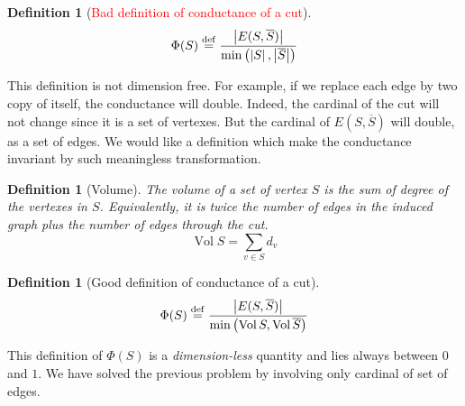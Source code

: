 \documentclass[12pt]{article}
\newtheorem{definition}[lemma]{Definition}
\newcommand{\defeq}{\stackrel{{\rm def}}{=}}
\newcommand{\card}[1]{\left\lvert#1\right\rvert}
\DeclareMathOperator{\vol}{Vol}
\begin{document}
\begin{definition}[\textcolor{red}{Bad definition of conductance of a cut}]
    \textcolor{red}{\[
        \Phi(S) \defeq \frac{\card{E(S,\overline{S})}}{\min\left(\card{S},\card{\overline{S}}\right)}
    \]}
\end{definition}

This definition is not dimension free. For example, if we replace each edge by two copy of itself, the conductance will double. Indeed, the cardinal of the cut will not change since it is a set of vertexes. But the cardinal of $E(S,\overline{S})$ will double, as a set of edges. We would like a definition which make the conductance invariant by such meaningless transformation.

\begin{definition}[Volume]
    The volume of a set of vertex $S$ is the sum of degree of the vertexes in $S$. Equivalently, it is twice the number of edges in the induced graph plus the number of edges through the cut.
    \[
        \vol S = \sum\limits_{v\in S}d_v
    \]
\end{definition}

   
\begin{definition}[\textcolor{green!50!black}{Good definition of conductance of a cut}]
    \textcolor{green!50!black}{
    \[
        \Phi(S) \defeq \frac{\card{E(S,\overline{S})}}{\min\left(\vol S,\vol \overline{S}\right)}
    \]}
\end{definition}

This definition of $\Phi(S)$ is a \emph{dimension-less} quantity and lies always between $0$ and $1$. We have solved the previous problem by involving only cardinal of set of edges.
\end{document}
